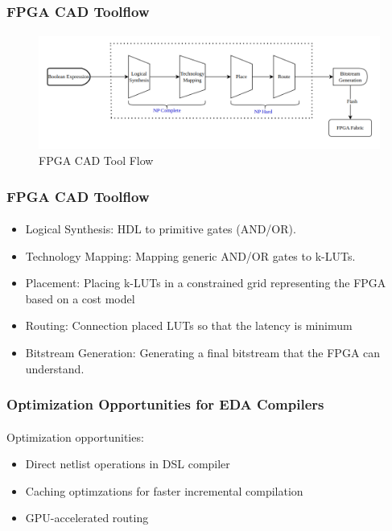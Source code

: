 \documentclass{beamer}
\begin{document}
{\begin{frame}[fragile]
  \frametitle{FPGA CAD Toolflow}
  \framesubtitle{}
   \begin{figure}
        \centering
        \includegraphics[width=1\linewidth]{images/cad_flow.png}
        \caption{FPGA CAD Tool Flow}
        \label{exa_cadflow}
    \end{figure}
\end{frame}

\begin{frame}[fragile]
  \frametitle{FPGA CAD Toolflow}
  \framesubtitle{}
   \begin{itemize}
     \item Logical Synthesis: HDL to primitive gates (AND/OR).
     \item Technology Mapping: Mapping generic AND/OR gates to k-LUTs.
     \item Placement: Placing k-LUTs in a constrained grid representing the FPGA
       based on a cost model
     \item Routing: Connection placed LUTs so that the latency is minimum
     \item Bitstream Generation: Generating a final bitstream that the FPGA
       can understand.
    \end{itemize}
\end{frame}

\begin{frame}[fragile]
  \frametitle{Optimization Opportunities for EDA Compilers}
  \framesubtitle{}
Optimization opportunities:
  \begin{itemize}
\item Direct netlist operations in DSL compiler
\item Caching optimzations for faster incremental compilation
\item GPU-accelerated routing
  \end{itemize}
\end{frame}

\begin{frame}[c,fragile]


\end{frame}}
\end{document}
